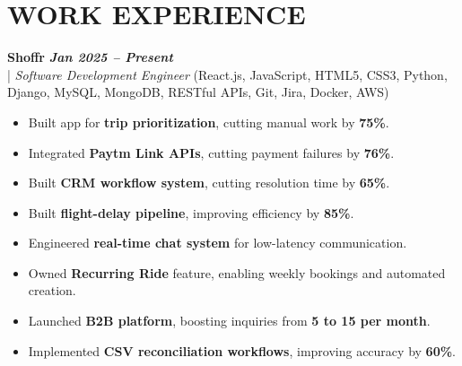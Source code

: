 \documentclass[10pt,a4paper]{article}
\begin{document}
\section*{WORK EXPERIENCE}
\small

\noindent
  \textbf{Shoffr} \hfill \textit{\textbf{Jan 2025 -- Present}} \\
  \;|\;
  \textit{Software Development Engineer} (React.js, JavaScript, HTML5, CSS3, Python, Django, MySQL, MongoDB, RESTful APIs, Git, Jira, Docker, AWS)
\begin{itemize}



\item Built app for \textbf{trip prioritization}, cutting manual work by \textbf{75\%}.



\item Integrated \textbf{Paytm Link APIs}, cutting payment failures by \textbf{76\%}.



\item Built \textbf{CRM workflow system}, cutting resolution time by \textbf{65\%}.



\item Built \textbf{flight-delay pipeline}, improving efficiency by \textbf{85\%}.



\item Engineered \textbf{real-time chat system} for low-latency communication.



\item Owned \textbf{Recurring Ride} feature, enabling weekly bookings and automated creation.



\item Launched \textbf{B2B platform}, boosting inquiries from \textbf{5 to 15 per month}.



\item Implemented \textbf{CSV reconciliation workflows}, improving accuracy by \textbf{60\%}.



\end{itemize}
\end{document}
